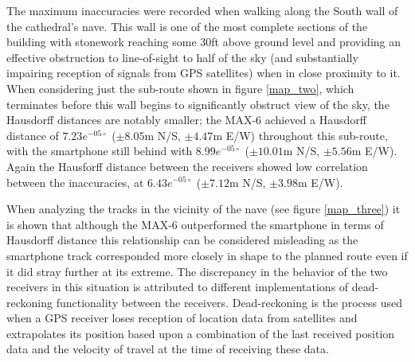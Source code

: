 The maximum inaccuracies were recorded when walking along the South wall of the cathedral's nave. This wall is one of the most complete sections of the building with stonework reaching some 30ft above ground level and providing an effective obstruction to line-of-sight to half of the sky (and substantially impairing reception of signals from GPS satellites) when in close proximity to it. When considering just the sub-route shown in figure \ref{map_two}, which terminates before this wall begins to significantly obstruct view of the sky, the Hausdorff distances are notably smaller; the MAX-6 achieved a Hausdorff distance of $7.23e^{-05\circ}$ ($\pm8.05$m N/S, $\pm4.47$m E/W) throughout this sub-route, with the smartphone still behind with $8.99e^{-05\circ}$ ($\pm10.01$m N/S, $\pm5.56$m E/W). Again the Hausforff distance between the receivers showed low correlation between the inaccuracies, at $6.43e^{-05\circ}$ ($\pm7.12$m N/S, $\pm3.98$m E/W).
 

When analyzing the tracks in the vicinity of the nave (see figure \ref{map_three}) it is shown that although the MAX-6 outperformed the smartphone in terms of Hausdorff distance this relationship can be considered misleading as the smartphone track corresponded more closely in shape to the planned route even if it did stray further at its extreme. The discrepancy in the behavior of the two receivers in this situation is attributed to different implementations of dead-reckoning functionality between the receivers. Dead-reckoning is the process used when a GPS receiver loses reception of location data from satellites and extrapolates its position based upon a combination of the last received position data and the velocity of travel at the time of receiving these data.
 

